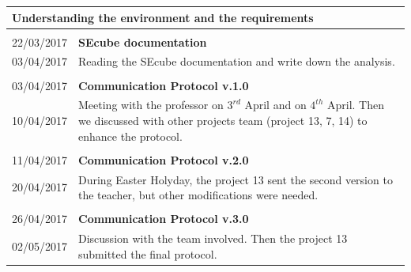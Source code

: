 \begin{table}[h]
	\begin{tabular}{p{1.9cm}|  p{13.5cm}}	
	\multicolumn{2}{p{15.0cm}}{ \LARGE{{Understanding the environment and the requirements}}}\\
	\hline \hline 
	\multicolumn{2}{p{1.0cm}}{ \Large{{}}}\\
	22/03/2017 & \textbf{SEcube documentation}\\
	03/04/2017& Reading the SEcube documentation and write down the analysis.\\
	\multicolumn{2}{p{1.0cm}}{ \Large{{ }}}\\		
	03/04/2017 & \textbf{Communication Protocol v.1.0}\\
	10/04/2017& Meeting with the professor on $ 3^{rd} $ April and on $ 4^{th} $ April. Then we discussed with other projects team (project 13, 7, 14) to enhance the protocol.
	\\ \multicolumn{2}{p{1.0cm}}{ \Large{{ }}}\\	
		11/04/2017 & \textbf{Communication Protocol v.2.0}\\
		20/04/2017 & During Easter Holyday, the project 13 sent the second version to the teacher, but other modifications were needed.\\
		\multicolumn{2}{p{1.0cm}}{ \Large{{ }}}\\	
		26/04/2017 & \textbf{Communication Protocol v.3.0}\\
		02/05/2017 & Discussion with the team involved. Then the project 13 submitted the final protocol.
\end{tabular}
\end{table}	

